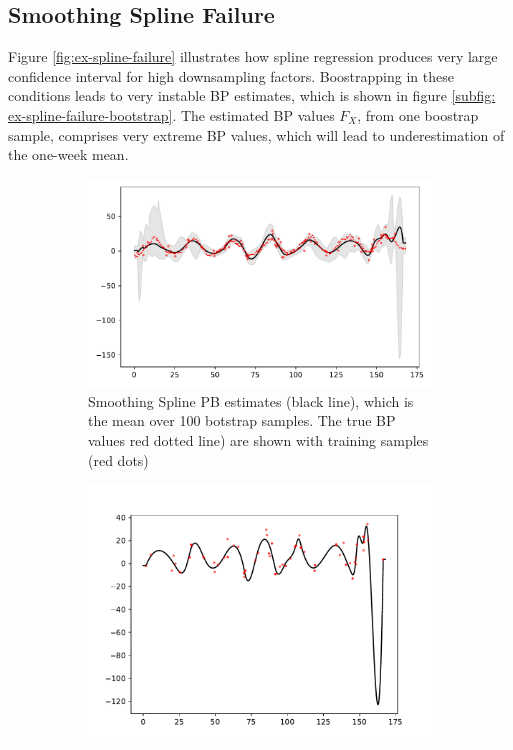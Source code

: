 \subsection{Smoothing Spline Failure}
Figure \ref{fig:ex-spline-failure} illustrates how spline regression
produces  very
large confidence interval for high downsampling factors.
Boostrapping in these conditions leads to very instable BP estimates,
which is shown in figure \ref{subfig: ex-spline-failure-bootstrap}.
The estimated BP values $F_X$, from one boostrap sample, comprises very extreme BP values, which will
lead to underestimation of the one-week mean.

\begin{figure}[!ht]
\centering
\begin{subfigure}{.5\textwidth}
    \centering
    \includegraphics[width=\linewidth]{Pictures/spline_extreme/plot_posterior_confint_spline}
    \caption{Smoothing Spline PB estimates (black line), which is the mean over 100 botstrap samples.
    The true BP values red dotted line) are shown with training samples (red dots)}
\end{subfigure}\hfill
\begin{subfigure}{.42\textwidth}
    \centering
    \includegraphics[width=\linewidth]{Pictures/spline_extreme/plot_pred_bootstrap_spline_reg_v2_70}

\end{subfigure}
\end{figure}
